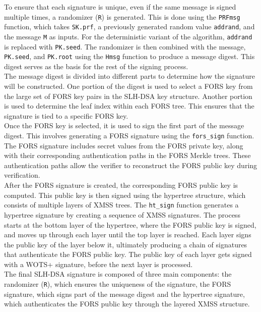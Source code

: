 \documentclass[journal=tosc,notanonymous]{iacrtrans}
\begin{document}
To ensure that each signature is unique, even if the same message is signed multiple times, a randomizer (\texttt{R}) is generated. This is done using the \texttt{PRFmsg} function, which takes \texttt{SK.prf}, a previously generated random value \texttt{addrand}, and the message \texttt{M} as inputs. For the deterministic variant of the algorithm, \texttt{addrand} is replaced with \texttt{PK.seed}. The randomizer is then combined with the message, \texttt{PK.seed}, and \texttt{PK.root} using the \texttt{Hmsg} function to produce a message digest. This digest serves as the basis for the rest of the signing process.\\
The message digest is divided into different parts to determine how the signature will be constructed. One portion of the digest is used to select a FORS key from the large set of FORS key pairs in the SLH-DSA key structure. Another portion is used to determine the leaf index within each FORS tree. This ensures that the signature is tied to a specific FORS key.\\
Once the FORS key is selected, it is used to sign the first part of the message digest. This involves generating a FORS signature using the \verb|fors_sign| function. The FORS signature includes secret values from the FORS private key, along with their corresponding authentication paths in the FORS Merkle trees. These authentication paths allow the verifier to reconstruct the FORS public key during verification.\\
After the FORS signature is created, the corresponding FORS public key is computed. This public key is then signed using the hypertree structure, which consists of multiple layers of XMSS trees. The \verb|ht_sign| function generates a hypertree signature by creating a sequence of XMSS signatures. The process starts at the bottom layer of the hypertree, where the FORS public key is signed, and moves up through each layer until the top layer is reached. Each layer signs the public key of the layer below it, ultimately producing a chain of signatures that authenticate the FORS public key. The public key of each layer gets signed with a WOTS+ signature, before the next layer is processed.\\
The final SLH-DSA signature is composed of three main components:
the randomizer (\texttt{R}), which ensures the uniqueness of the signature, the FORS signature, which signs part of the message digest and the hypertree signature, which authenticates the FORS public key through the layered XMSS structure.\\
\end{document}

